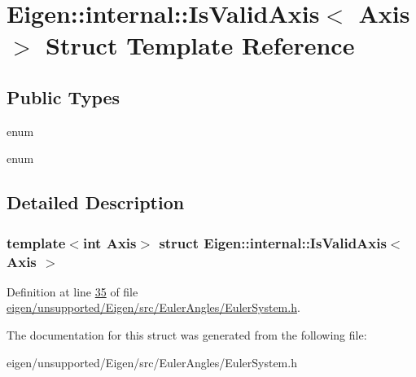 \hypertarget{struct_eigen_1_1internal_1_1_is_valid_axis}{}\section{Eigen\+:\+:internal\+:\+:Is\+Valid\+Axis$<$ Axis $>$ Struct Template Reference}
\label{struct_eigen_1_1internal_1_1_is_valid_axis}
\subsection*{Public Types}
\begin{DoxyCompactItemize}
\item 
\mbox{\label{struct_eigen_1_1internal_1_1_is_valid_axis_ae466827128f47f6220a0a7d969c6bd33}} 
enum 
\item 
\mbox{\label{struct_eigen_1_1internal_1_1_is_valid_axis_a92f11d3f9196c3f53fb76de2582b4762}} 
enum 
\end{DoxyCompactItemize}


\subsection{Detailed Description}
\subsubsection*{template$<$int Axis$>$\newline
struct Eigen\+::internal\+::\+Is\+Valid\+Axis$<$ Axis $>$}



Definition at line \hyperlink{eigen_2unsupported_2_eigen_2src_2_euler_angles_2_euler_system_8h_source_l00035}{35} of file \hyperlink{eigen_2unsupported_2_eigen_2src_2_euler_angles_2_euler_system_8h_source}{eigen/unsupported/\+Eigen/src/\+Euler\+Angles/\+Euler\+System.\+h}.



The documentation for this struct was generated from the following file\+:\begin{DoxyCompactItemize}
\item 
eigen/unsupported/\+Eigen/src/\+Euler\+Angles/\+Euler\+System.\+h\end{DoxyCompactItemize}
